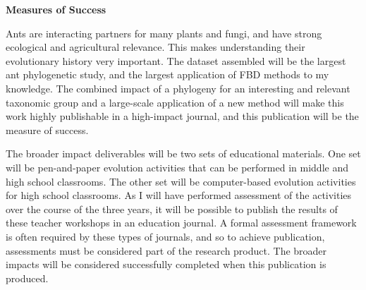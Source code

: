\documentclass[12pt]{article}
\begin{document}
\textbf{Measures of Success}

Ants are interacting partners for many plants and fungi, and have strong ecological and agricultural relevance.
This makes understanding their evolutionary history very important.
The dataset assembled will be the largest ant phylogenetic study, and the largest application of FBD methods to my knowledge.
The combined impact of a phylogeny for an interesting and relevant taxonomic group and a large-scale application of a new method will make this work highly publishable in a high-impact journal, and this publication will be the measure of success. \par
The broader impact deliverables will be two sets of educational materials.
One set will be pen-and-paper evolution activities that can be performed in middle and high school classrooms.
The other set will be computer-based evolution activities for high school classrooms.
As I will have performed assessment of the activities over the course of the three years, it will be possible to publish the results of these teacher workshops in an education journal.
A formal assessment framework is often required by these types of journals, and so to achieve publication, assessments must be considered part of the research product. 
The broader impacts will be considered successfully completed when this publication is produced.\par
\end{document}
